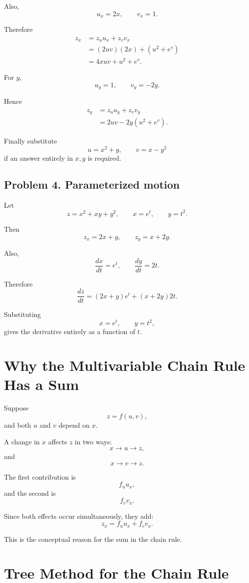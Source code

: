 \documentclass[11pt,oneside]{book}
\theoremstyle{studentthm}
\theoremstyle{definition}
\begin{document}
Also,
\[
u_x=2x,\qquad v_x=1.
\]

Therefore
\[
\begin{aligned}
z_x
&=
z_u u_x+z_v v_x\\
&=
(2uv)(2x)+(u^2+e^v)\\
&=
4xuv+u^2+e^v.
\end{aligned}
\]

For \(y\),
\[
u_y=1,\qquad v_y=-2y.
\]

Hence
\[
\begin{aligned}
z_y
&=
z_u u_y+z_v v_y\\
&=
2uv-2y(u^2+e^v).
\end{aligned}
\]

Finally substitute
\[
u=x^2+y,\qquad v=x-y^2
\]
if an answer entirely in \(x,y\) is required.

\subsection*{Problem 4. Parameterized motion}

Let
\[
z=x^2+xy+y^2,
\qquad
x=e^t,
\qquad
y=t^2.
\]

Then
\[
z_x=2x+y,
\qquad
z_y=x+2y.
\]

Also,
\[
\frac{dx}{dt}=e^t,
\qquad
\frac{dy}{dt}=2t.
\]

Therefore
\[
\frac{dz}{dt}
=
(2x+y)e^t
+
(x+2y)2t.
\]

Substituting
\[
x=e^t,\qquad y=t^2,
\]
gives the derivative entirely as a function of \(t\).



\section{Why the Multivariable Chain Rule Has a Sum}

Suppose
\[
z=f(u,v),
\]
and both \(u\) and \(v\) depend on \(x\).

A change in \(x\) affects \(z\) in two ways:
\[
x\longrightarrow u\longrightarrow z,
\]
and
\[
x\longrightarrow v\longrightarrow z.
\]

The first contribution is
\[
f_u u_x,
\]
and the second is
\[
f_v v_x.
\]

Since both effects occur simultaneously, they add:
\[
z_x=f_u u_x+f_v v_x.
\]

This is the conceptual reason for the sum in the chain rule.

\section{Tree Method for the Chain Rule}
\end{document}
